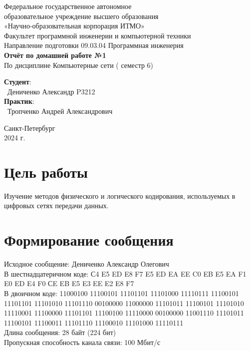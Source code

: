 \documentclass{article}
\begin{document}
\begin{center}
    \Large
    Федеральное государственное автономное \\
    образовательное учреждение высшего образования \\ 
    «Научно-образовательная корпорация ИТМО»\\
    \vspace{0.5cm}
    \large
    Факультет программной инженерии и компьютерной техники \\
    Направление подготовки 09.03.04 Программная инженерия \\
    \vspace{1cm}
    \Large
    \textbf{Отчёт по домашней работе №1} \\
        По дисциплине Компьютерные сети ( семестр 6)\\
    \large
    \vspace{8cm}

    \begin{minipage}{.33\textwidth}
    \end{minipage}
    \hfill
    \begin{minipage}{.4\textwidth}
    
        \textbf{Студент}: \vspace{.1cm} \\
        \ Дениченко Александр P3212\\
        \textbf{Практик}:  \\
        \ Тропченко Андрей Александрович
    \end{minipage}
    \vfill
Санкт-Петербург\\ 2024 г.
\end{center}
\pagestyle{empty}
\newpage
\pagestyle{plain}

\section*{Цель работы}
Изучение методов физического и логического кодирования,
используемых в цифровых сетях передачи данных.

\section{Формирование сообщения}

Исходное сообщение: Дениченко Александр Олегович
\\
В шестнадцатеричном коде: С4 E5 ED E8 F7 E5 ED EA EE C0 EB E5 EA F1 E0 ED E4 F0 СE EB E5 E3 EE E2 E8 F7
\\
В двоичном коде: 11000100 11100101 11101101 11101000 11110111 11100101 11101101 11101010 11101110 00100000 11000000 11101011 11100101 11101010 11110001 11100000 11101101 11100100 11110000 00100000 11001110 11101011 11100101 11100011 11101110 11100010 11101000 11110111
\\
Длина сообщения: 28 байт (224 бит)
\\
Пропускная способность канала связи: 100 Мбит/с 
\end{document}
